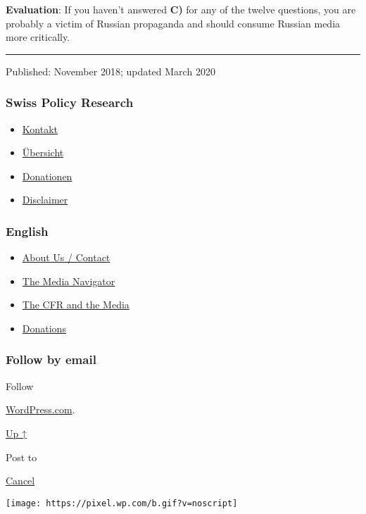 \textbf{Evaluation}: If you haven't answered \textbf{C)} for any of the
twelve questions, you are probably a victim of Russian propaganda and
should consume Russian media more critically.

\begin{center}\rule{0.5\linewidth}{\linethickness}\end{center}

Published: November 2018; updated March 2020

\hypertarget{swiss-policy-research}{%
\subsubsection{Swiss Policy Research}\label{swiss-policy-research}}

\begin{itemize}
\tightlist
\item
  \href{https://swprs.org/kontakt/}{Kontakt}
\item
  \href{https://swprs.org/uebersicht/}{Übersicht}
\item
  \href{https://swprs.org/donationen/}{Donationen}
\item
  \href{https://swprs.org/disclaimer/}{Disclaimer}
\end{itemize}

\hypertarget{english}{%
\subsubsection{English}\label{english}}

\begin{itemize}
\tightlist
\item
  \href{https://swprs.org/contact/}{About Us / Contact}
\item
  \href{https://swprs.org/media-navigator/}{The Media Navigator}
\item
  \href{https://swprs.org/the-american-empire-and-its-media/}{The CFR
  and the Media}
\item
  \href{https://swprs.org/donations/}{Donations}
\end{itemize}

\hypertarget{follow-by-email}{%
\subsubsection{Follow by email}\label{follow-by-email}}

Follow

\href{https://wordpress.com/?ref=footer_custom_com}{WordPress.com}.

\protect\hyperlink{}{Up ↑}

Post to

\protect\hyperlink{}{Cancel}

\texttt{[image: https://pixel.wp.com/b.gif?v=noscript]}
